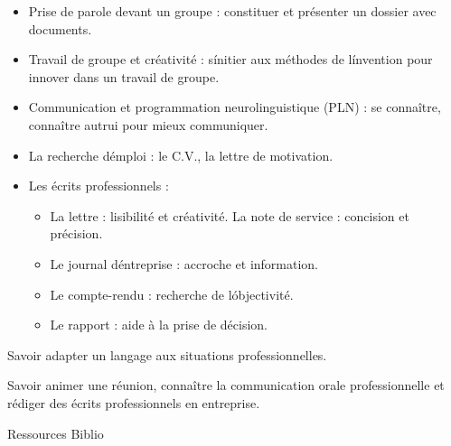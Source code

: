 {
\begin{itemize} 
 \item Prise de parole devant un groupe : constituer et présenter un dossier avec documents.
 \item Travail de groupe et créativité : s\'initier aux méthodes de l\'invention pour innover dans un travail de groupe.
 \item Communication et programmation neurolinguistique (PLN) : se connaître, connaître autrui pour mieux communiquer.
 \item La recherche d\'emploi : le C.V., la lettre de motivation.
 \item Les écrits professionnels :
  \begin{itemize} 
    \item La lettre : lisibilité et créativité. La note de service : concision et précision.
    \item Le journal d\'entreprise : accroche et information.
    \item Le compte-rendu : recherche de l\'objectivité.
    \item Le rapport : aide à la prise de décision. 
  \end{itemize} 
\end{itemize} 
} 
{Savoir adapter un langage aux situations professionnelles.
} 
{\begin{itemize} 
 \ObjItem Savoir animer une réunion, connaître la communication orale professionnelle et rédiger des écrits professionnels en entreprise. 
\end{itemize} 
} 
{Ressources} 
{Biblio} 
 
\vfill

